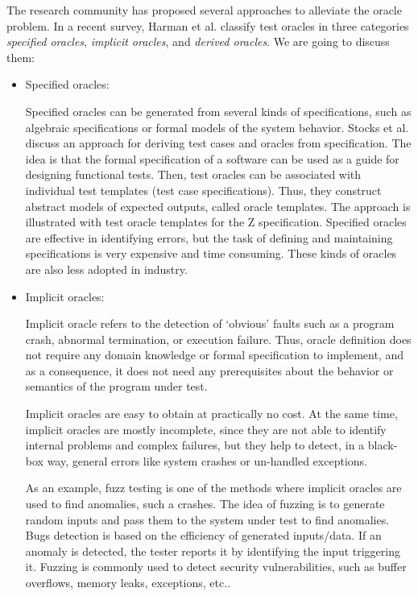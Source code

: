 The research community has proposed several approaches\cite{harman2013comprehensive,barr2015oracle} to alleviate the oracle problem. 
In a recent survey, Harman et al.\cite{harman2013comprehensive} classify test oracles in three categories \textit{specified oracles}, \textit{implicit oracles}, and \textit{derived oracles}. We are going to discuss them:
\begin{itemize}
\item Specified oracles:

Specified oracles can be generated from several kinds of specifications, such as algebraic specifications or formal models of the system behavior. 	
Stocks et al.\cite{stocks1996framework,richardson1992specification} discuss an approach for deriving test cases and oracles from specification. The idea is that the formal specification of a software can be used as a guide for designing functional tests. Then, test oracles can be associated with individual test templates (test case specifications). Thus, they construct abstract models of expected outputs, called oracle templates. 
The approach is illustrated with test oracle templates for the Z specification.
Specified oracles are effective in identifying errors, but the task of defining and maintaining specifications is very expensive and time consuming. These kinds of oracles are also less adopted in industry.

\item Implicit oracles:

Implicit oracle refers to the detection of ‘obvious’ faults such as a program crash, abnormal termination, or execution failure.
Thus, oracle definition does not require any domain knowledge or formal specification to implement, and as a consequence, it does not need any prerequisites about the behavior or semantics of the program under test.

Implicit oracles\cite{harman2013comprehensive,barr2015oracle} are easy to obtain at practically no cost. At the same time, implicit oracles are mostly incomplete, since they are not able to identify internal problems and complex failures, but they help to detect, in a black-box way, general errors like system crashes or un-handled exceptions.

As an example, fuzz testing\cite{miller1990empirical} is one of the methods where implicit oracles are used to find anomalies, such a crashes. The idea of fuzzing is to generate random inputs and
pass them to the system under test to find anomalies.
Bugs detection is based on the efficiency of generated inputs/data. If an anomaly is detected,
the tester reports it by identifying the input triggering it. 
Fuzzing is commonly used to detect security vulnerabilities, such as buffer overflows, memory   leaks, exceptions, etc.\cite{bekrar2011finding}.



\end{itemize}
